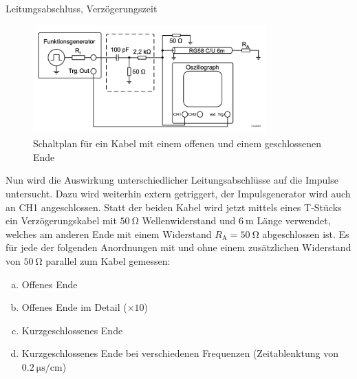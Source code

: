 \documentclass[ngerman]{scrartcl}
\theoremstyle{definition}
\begin{document}
		\begin{aufgabe}{Leitungsabschluss, Verzögerungszeit}
			\begin{figure}[h!]
				\centering
				\includegraphics[width=0.8\textwidth]{Aufbau_1_3_Leitungsabschluss.png}
				\caption{Schaltplan für ein Kabel mit einem offenen und einem geschlossenen Ende \cite{anleitung}}
				\label{fig:aufbau_1_3_leitungsabschluss}
			\end{figure}
			Nun wird die Auswirkung unterschiedlicher Leitungsabschlüsse auf die Impulse untersucht. Dazu wird weiterhin extern getriggert, der Impulsgenerator wird auch an CH1 angeschlossen. Statt der beiden Kabel wird jetzt mittels eines T-Stücks ein Verzögerungskabel mit $\SI{50}{\ohm}$ Wellenwiderstand und $\SI{6}{\meter}$ Länge verwendet, welches am anderen Ende mit einem Widerstand $R_\mathrm{A} = \SI{50}{\ohm}$ abgeschlossen ist. Es für jede der folgenden Anordnungen mit und ohne einem zusätzlichen Widerstand von $\SI{50}{\ohm}$ parallel zum Kabel gemessen:
			\begin{enumerate}[(a)]
				\item Offenes Ende
				\item Offenes Ende im Detail ($\times 10$)
				\item Kurzgeschlossenes Ende
				\item Kurzgeschlossenes Ende bei verschiedenen Frequenzen (Zeitablenktung von $\SI{0.2}{\micro\second\per\centi\meter}$)
			\end{enumerate}
		\end{aufgabe}
\end{document}
